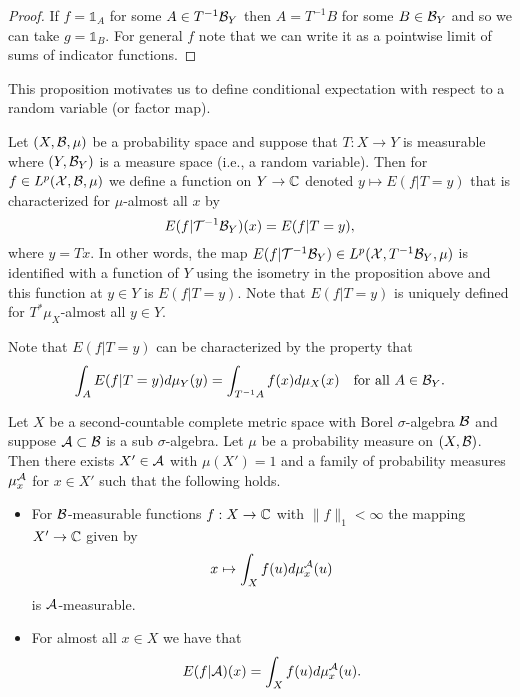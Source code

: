 \documentclass[twoside, a4paper, 10pt]{amsart}
\begin{document}
\begin{proof} If $f = \mathds{1}_A$ for some $A \in T^{-1}\mathcal{B}_Y$ then $A = T^{-1}B$ for some $B \in \mathcal{B}_Y$ and so we can take $g = \mathds{1}_B$. For general $f$ note that we can write it as a pointwise limit of sums of indicator functions. \end{proof}

This proposition motivates us to define conditional expectation with respect to a random variable (or factor map). 

\begin{mydef} Let $(X, \mathcal{B}, \mu)$ be a probability space and suppose that $T:X \to Y$ is measurable where $(Y, \mathcal{B}_Y)$ is a measure space (i.e., a random variable). Then for $f \in L^p(\mathcal{X},\mathcal{B},\mu)$ we define a function on $Y \to \mathbb{C}$ denoted $y \mapsto E(f| T=y)$ that is characterized for $\mu$-almost all $x$ by  $$E(f|\mathcal{T}^{-1}\mathcal{B}_Y)(x) = E(f| T=y),$$ where $y = Tx$. In other words, the map $E(f|\mathcal{T}^{-1}\mathcal{B}_Y) \in L^p(\mathcal{X},T^{-1}\mathcal{B}_Y,\mu)$ is identified with a function of $Y$ using the isometry in the proposition above and this function at $y \in Y$ is  $E(f| T=y)$. Note that $E(f|T=y)$ is uniquely defined for $T^*\mu_X$-almost all $y \in Y$.

\end{mydef}

Note that $E(f|T=y)$ can be characterized by the property that $$\int_A E(f|T=y) d\mu_Y(y) = \int_{T^{-1}A} f(x) d\mu_X(x) \quad \text{for all } A \in \mathcal{B}_Y.$$ 

\begin{thm} Let $X$ be a second-countable complete metric space with Borel $\sigma$-algebra $\mathcal{B}$ and suppose $\mathcal{A} \subset \mathcal{B}$ is a sub $\sigma$-algebra. Let $\mu$ be a probability measure on $(X,\mathcal{B})$. Then there exists $X' \in \mathcal{A}$ with $\mu(X')=1$ and a family of probability measures $\mu_x^{\mathcal{A}}$ for $x \in X'$ such that the following holds.

\begin{itemize}
	\item For $\mathcal{B}$-measurable functions $f:X \to \mathbb{C}$ with $\|f\|_1 < \infty$ the mapping $X' \to \mathbb{C}$ given by $$x \mapsto \int_X f(u) d\mu_x^{\mathcal{A}} (u)$$ is $\mathcal{A}$-measurable.
	\item For almost all $x \in X$ we have that $$E(f|\mathcal{A})(x) = \int_X f(u) d\mu_x^{\mathcal{A}} (u).$$

\end{itemize}

\end{thm}
\end{document}
